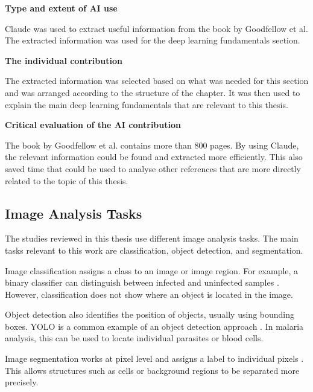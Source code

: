 \begin{tcolorbox}[
    colback=gray!15,
    colframe=gray!50,
    boxrule=0.5pt
]

\textbf{Type and extent of AI use}

Claude was used to extract useful information from the book by Goodfellow et al. The extracted information was used for the deep learning fundamentals section.

\vspace{0.4cm}

\textbf{The individual contribution}

The extracted information was selected based on what was needed for this section and was arranged according to the structure of the chapter. It was then used to explain the main deep learning fundamentals that are relevant to this thesis.

\vspace{0.4cm}

\textbf{Critical evaluation of the AI contribution}

The book by Goodfellow et al. contains more than 800 pages. By using Claude, the relevant information could be found and extracted more efficiently. This also saved time that could be used to analyse other references that are more directly related to the topic of this thesis.

\end{tcolorbox}

\subsection{Image Analysis Tasks}

The studies reviewed in this thesis use different image analysis tasks. The main tasks relevant to this work are classification, object detection, and segmentation.

Image classification assigns a class to an image or image region. For example, a binary classifier can distinguish between infected and uninfected samples \cite{Rajaraman2018}. However, classification does not show where an object is located in the image.

Object detection also identifies the position of objects, usually using bounding boxes. YOLO is a common example of an object detection approach \cite{Redmon2016}. In malaria analysis, this can be used to locate individual parasites or blood cells.

Image segmentation works at pixel level and assigns a label to individual pixels \cite{Kassim2021RBCNet}. This allows structures such as cells or background regions to be separated more precisely.


